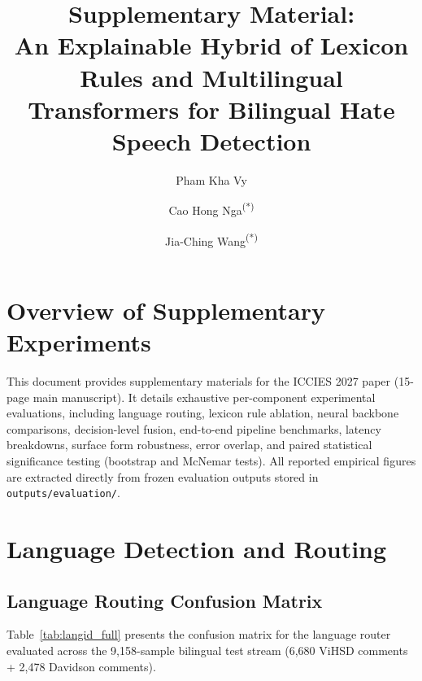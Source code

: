 \documentclass[runningheads]{llncs}
\begin{document}
\title{Supplementary Material:\\ An Explainable Hybrid of Lexicon Rules and Multilingual Transformers for Bilingual Hate Speech Detection}
\author{
Pham Kha Vy
 \and
Cao Hong Nga\textsuperscript{(*)}
\and
Jia-Ching Wang\textsuperscript{(*)}
}

\maketitle

\section{Overview of Supplementary Experiments}
This document provides supplementary materials for the ICCIES 2027 paper (15-page main manuscript). It details exhaustive per-component experimental evaluations, including language routing, lexicon rule ablation, neural backbone comparisons, decision-level fusion, end-to-end pipeline benchmarks, latency breakdowns, surface form robustness, error overlap, and paired statistical significance testing (bootstrap and McNemar tests). All reported empirical figures are extracted directly from frozen evaluation outputs stored in \texttt{outputs/evaluation/}.

\section{Language Detection and Routing}
\subsection{Language Routing Confusion Matrix}
Table~\ref{tab:langid_full} presents the confusion matrix for the language router evaluated across the 9,158-sample bilingual test stream (6,680 ViHSD comments + 2,478 Davidson comments).
\end{document}
